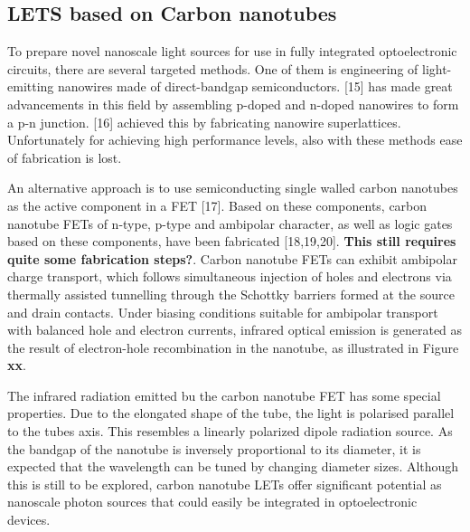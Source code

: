 \subsection{LETS based on Carbon nanotubes} %

To prepare novel nanoscale light sources for use in fully integrated optoelectronic circuits, there are several targeted methods. One of them is engineering of light-emitting nanowires made of direct-bandgap semiconductors. [15] has made great advancements in this field by assembling p-doped and n-doped nanowires to form a p-n junction. [16] achieved this by fabricating nanowire superlattices. Unfortunately for achieving high performance levels, also with these methods ease of fabrication is lost.

An alternative approach is to use semiconducting single walled carbon nanotubes as the active component in a FET [17]. Based on these components, carbon nanotube FETs of n-type, p-type and ambipolar character, as well as logic gates based on these components, have been fabricated [18,19,20]. \textbf{This still requires quite some fabrication steps?}. Carbon nanotube FETs can exhibit ambipolar charge transport, which follows simultaneous injection of holes and electrons via thermally assisted tunnelling through the Schottky barriers formed at the source and drain contacts. Under biasing conditions suitable for ambipolar transport with balanced hole and electron currents, infrared optical emission is generated as the result of electron-hole recombination in the nanotube, as illustrated in Figure \textbf{xx}. 

The infrared radiation emitted bu the carbon nanotube FET has some special properties. Due to the elongated shape of the tube, the light is polarised parallel to the tubes axis. This resembles a linearly polarized dipole radiation source. As the bandgap of the nanotube is inversely proportional to its diameter, it is expected that the wavelength can be tuned by changing diameter sizes. Although this is still to be explored, carbon nanotube LETs offer significant potential as nanoscale photon sources that could easily be integrated in optoelectronic devices.

